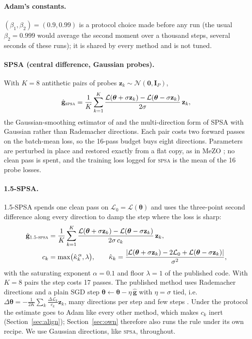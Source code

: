 \documentclass{article}
\newcommand{\method}[1]{\textsc{#1}}
\newcommand{\SPSA}{\method{spsa}}
\newcommand{\SPSAb}{\method{1.5-spsa}}
\newcommand{\ghat}{\hat{\mathbf{g}}}
\newcommand{\btheta}{\boldsymbol{\theta}}
\newcommand{\bz}{\mathbf{z}}
\newcommand{\bI}{\mathbf{I}}
\newcommand{\loss}{\mathcal{L}}
\begin{document}
\paragraph{Adam's constants.}
$(\beta_1,\beta_2)=(0.9,0.99)$ is a protocol choice made before any run (the usual
$\beta_2=0.999$ would average the second moment over a thousand steps, several seconds
of these runs); it is shared by every method and is not tuned.

\paragraph{SPSA (central difference, Gaussian probes).}
With $K=8$ antithetic pairs of probes $\bz_k\sim\mathcal{N}(\mathbf{0},\bI_P)$,
\begin{equation}
  \ghat_{\SPSA}
  = \frac{1}{K}\sum_{k=1}^{K}\frac{\loss(\btheta+\sigma\bz_k)-\loss(\btheta-\sigma\bz_k)}{2\sigma}\,\bz_k ,
  \label{eq:spsa}
\end{equation}
the Gaussian-smoothing estimator of \citet{nesterov2017} and the multi-direction form
of SPSA \citep{spall1992} with Gaussian rather than Rademacher directions. Each pair
costs two forward passes on the batch-mean loss, so the 16-pass budget buys eight
directions. Parameters are perturbed in place and restored exactly from a flat copy, as
in MeZO \citep{malladi2023}; no clean pass is spent, and the training loss logged for
\SPSA{} is the mean of the 16 probe losses.

\paragraph{1.5-SPSA.}
1.5-SPSA \citep{chaubard2025spsa15} spends one clean pass on $\loss_0=\loss(\btheta)$
and uses the three-point second difference along every direction to damp the step where
the loss is sharp:
\begin{equation}
\begin{aligned}
  \ghat_{\SPSAb}&=\frac{1}{K}\sum_{k=1}^{K}
    \frac{\loss(\btheta+\sigma\bz_k)-\loss(\btheta-\sigma\bz_k)}{2\sigma\,c_k}\,\bz_k,\\
  c_k&=\max\bigl(\hat\kappa_k^{\,\alpha},\lambda\bigr),\qquad
  \hat\kappa_k=\frac{|\loss(\btheta+\sigma\bz_k)-2\loss_0+\loss(\btheta-\sigma\bz_k)|}{\sigma^{2}},
\end{aligned}
  \label{eq:spsa15}
\end{equation}
with the saturating exponent $\alpha=0.1$ and floor $\lambda=1$ of the published code.
With $K=8$ pairs the step costs 17 passes. The published method uses Rademacher
directions and a plain SGD step $\btheta\leftarrow\btheta-\eta\,\ghat$ with $\eta=\sigma$
tied, i.e.\ $\Delta\btheta=-\frac{1}{2K}\sum_k \frac{\Delta\loss_k}{c_k}\bz_k$, many
directions per step and few steps \citep{chaubard2025spsa15}. Under the protocol the
estimate goes to Adam like every other method, which makes $c_k$ inert
(Section~\ref{sec:align}); Section~\ref{sec:own} therefore also runs the rule under its
own recipe. We use Gaussian directions, like \SPSA{}, throughout.
\end{document}
